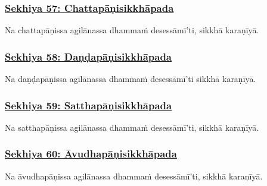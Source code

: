 \subsubsection*{\hyperref[training57]{Sekhiya 57: Chattapāṇisikkhāpada}}
\label{sekh57}

Na chattapāṇissa agilānassa\makeatletter\hyperlink{endnote508-appendix}\makeatother{} dhammaṁ desessāmī'ti,\makeatletter\hyperlink{endnote509-appendix}\makeatother{} sikkhā karaṇīyā.



\subsubsection*{\hyperref[training58]{Sekhiya 58: Daṇḍapāṇisikkhāpada}}
\label{sekh58}

Na daṇḍapāṇissa agilānassa dhammaṁ desessāmī'ti sikkhā karaṇīyā.



\subsubsection*{\hyperref[training59]{Sekhiya 59: Satthapāṇisikkhāpada}}
\label{sekh59}

Na satthapāṇissa agilānassa\makeatletter\hyperlink{endnote510-appendix}\makeatother{} dhammaṁ desessāmī'ti, sikkhā karaṇīyā.



\subsubsection*{\hyperref[training60]{Sekhiya 60: Āvudhapāṇisikkhāpada}}
\label{sekh60}

Na āvudhapāṇissa\makeatletter\hyperlink{endnote511-appendix}\makeatother{} agilānassa dhammaṁ desessāmī'ti, sikkhā karaṇīyā.


